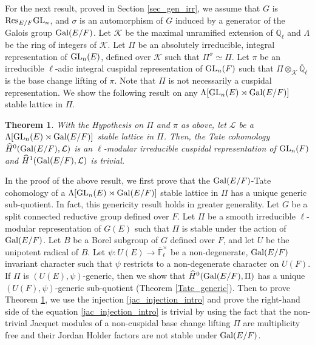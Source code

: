 \documentclass[10pt, reqno]{amsart}
\theoremstyle{plain}
\numberwithin{equation}{section} \newcommand{\di}{\operatorname{dim}}
\newtheorem{theorem}{Theorem}[subsection]
\begin{document}
For the next result, proved in Section \ref{sec_gen_irr}, we assume
that $G$ is ${\rm Res}_{E/F} {\rm GL}_n$, and $\sigma$ is an
automorphism of $G$ induced by a generator of the Galois group
${\rm Gal}(E/F)$. Let $\mathcal{K}$ be the maximal unramified
extension of $\mathbb{Q}_\ell$ and $\Lambda$ be the ring of integers
of $\mathcal{K}$.  Let $\Pi$ be an absolutely irreducible, integral
representation of ${\rm GL}_n(E)$, defined over $\mathcal{K}$ such
that $\Pi^\sigma\simeq \Pi$.  Let $\pi$ be an irreducible $\ell$-adic
integral cuspidal representation of ${\rm GL}_n(F)$ such that
$\Pi\otimes_\mathcal{K}\overline{\mathbb{Q}}_\ell$ is the base change
lifting of $\pi$. Note that $\Pi$ is not necessarily a cuspidal
representation. We show the following result on any
$\Lambda[{\rm GL}_n(E)\rtimes {\rm Gal}(E/F)]$ stable lattice in
$\Pi$.
\begin{theorem}\label{intro_gln}
With the Hypothesis on $\Pi$ and $\pi$ as above, 
  let $\mathcal{L}$ be a $\Lambda[{\rm GL}_n(E)\rtimes {\rm Gal}(E/F)]$ stable
  lattice in $\Pi$. Then, the Tate cohomology
  $\widehat{H}^0({\rm Gal}(E/F), \mathcal{L})$ is an $\ell$-modular irreducible
  cuspidal representation of ${\rm GL}_n(F)$ and 
  $\widehat{H}^1({\rm Gal}(E/F), \mathcal{L})$ is trivial. 
\end{theorem}
In the proof of the above result, we first prove that the
${\rm Gal}(E/F)$-Tate cohomology of a
$\Lambda[{\rm GL}_n(E)\rtimes {\rm Gal}(E/F)]$ stable lattice in $\Pi$
has a unique generic sub-quotient. In fact, this genericity result
holds in greater generality. Let $G$ be a split connected reductive
group defined over $F$. Let $\Pi$ be a smooth irreducible
$\ell$-modular representation of $G(E)$ such that $\Pi$ is stable
under the action of ${\rm Gal}(E/F)$. Let $B$ be a Borel subgroup of
$G$ defined over $F$, and let $U$ be the unipotent radical of $B$. Let
$\psi:U(E)\rightarrow \overline{\mathbb{F}}_\ell^\times$ be a
non-degenerate, ${\rm Gal}(E/F)$ invariant character such that $\psi$
restricts to a non-degenerate character on $U(F)$. If $\Pi$ is
$(U(E), \psi)$-generic, then we show that
$\widehat{H}^0({\rm Gal}(E/F), \Pi)$ has a unique
$(U(F), \psi)$-generic sub-quotient (Theorem \ref{Tate_generic}). Then
to prove Theorem \ref{intro_gln}, we use the injection
\eqref{jac_injection_intro} and prove the right-hand side of the
equation \eqref{jac_injection_intro} is trivial by using the fact that
the non-trivial Jacquet modules of a non-cuspidal base change lifting
$\Pi$ are multiplicity free and their Jordan Holder factors are not
stable under ${\rm Gal}(E/F)$.
\end{document}
